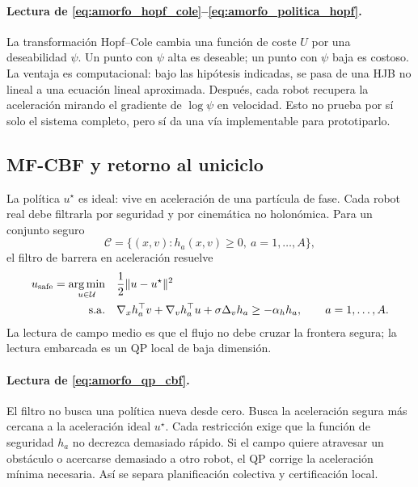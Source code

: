 \paragraph{Lectura de \eqref{eq:amorfo_hopf_cole}--\eqref{eq:amorfo_politica_hopf}.}
La transformación Hopf--Cole cambia una función de coste $U$ por una deseabilidad
$\psi$. Un punto con $\psi$ alta es deseable; un punto con $\psi$ baja es costoso. La
ventaja es computacional: bajo las hipótesis indicadas, se pasa de una HJB no lineal a
una ecuación lineal aproximada. Después, cada robot recupera la aceleración mirando el
gradiente de $\log\psi$ en velocidad. Esto no prueba por sí solo el sistema completo,
pero sí da una vía implementable para prototiparlo.

\subsection{MF-CBF y retorno al uniciclo}
\label{subsec:amorfo-mfcbf-uniciclo}

La política $u^\star$ es ideal: vive en aceleración de una partícula de fase. Cada robot
real debe filtrarla por seguridad y por cinemática no holonómica. Para un conjunto seguro
\begin{equation}
  \mathcal C=\{(x,v): h_a(x,v)\ge0,\ a=1,\ldots,A\},
  \label{eq:amorfo_conjunto_seguro}
\end{equation}
el filtro de barrera en aceleración resuelve
\begin{equation}
\begin{aligned}
  u_{\mathrm{safe}}
  =
  \operatorname*{arg\,min}_{u\in\mathcal U}
  &\quad \frac12\|u-u^\star\|^2\\
  \mathrm{s.a.}
  &\quad
  \nabla_xh_a^\top v+\nabla_vh_a^\top u+\sigma\Delta_vh_a
  \ge -\alpha_h h_a,
  \qquad a=1,\ldots,A .
\end{aligned}
\label{eq:amorfo_qp_cbf}
\end{equation}
La lectura de campo medio es que el flujo no debe cruzar la frontera segura; la lectura
embarcada es un QP local de baja dimensión.

\paragraph{Lectura de \eqref{eq:amorfo_qp_cbf}.}
El filtro no busca una política nueva desde cero. Busca la aceleración segura más cercana
a la aceleración ideal $u^\star$. Cada restricción exige que la función de seguridad
$h_a$ no decrezca demasiado rápido. Si el campo quiere atravesar un obstáculo o acercarse
demasiado a otro robot, el QP corrige la aceleración mínima necesaria. Así se separa
planificación colectiva y certificación local.

